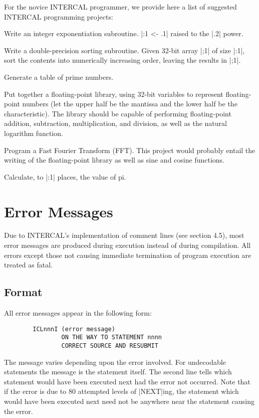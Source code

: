 For the novice INTERCAL programmer, we provide here a list of suggested 
INTERCAL programming projects:

Write an integer exponentiation subroutine.  |:1 <- .1| raised to the |.2| power.

Write a double-precision sorting subroutine.  Given 32-bit array |;1| of
size |:1|, sort the contents into numerically increasing order, leaving the
results in |;1|.

Generate a table of prime numbers.

Put together a floating-point library, using 32-bit variables to represent
floating-point numbers (let the upper half be the mantissa and the lower
half be the characteristic).   The library should be capable of performing 
floating-point addition, subtraction, multiplication, and division, as well
as the natural logarithm function.

Program a Fast Fourier Transform (FFT).   This project would probably entail
the writing of the floating-point library as well as sine and cosine functions.

Calculate, to |:1| places, the value of pi.







\section{Error Messages}

Due to INTERCAL's implementation of comment lines (see section 4.5), most
error messages are produced during execution instead of during compilation.
All errors except those not causing immediate termination of program execution
are treated as fatal.

\subsection{Format}

All error messages appear in the following form:

\begin{verbatim}
        ICLnnnI (error message)
                ON THE WAY TO STATEMENT nnnn
                CORRECT SOURCE AND RESUBMIT
\end{verbatim}

The message varies depending upon the error involved.  For undecodable
statements the message is the statement itself.  The second line tells
which statement would have been executed next had the error not occurred.
Note that if the error is due to 80 attempted levels of |NEXT|ing, the
statement which would have been executed next need not be anywhere near the
statement causing the error.

